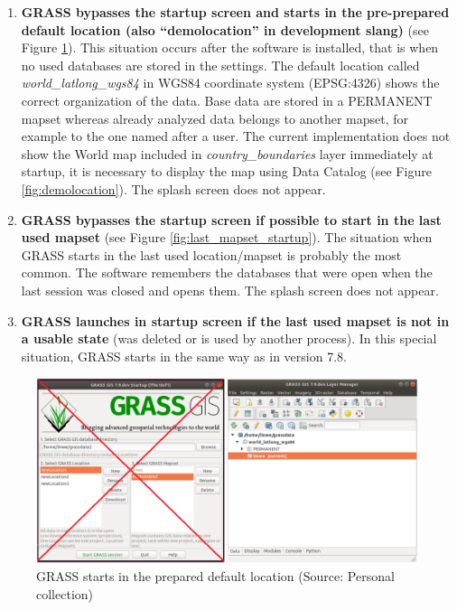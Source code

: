 \documentclass[a4paper,10pt,twoside]{article}
\begin{document}
\begin{enumerate}

\item \textbf{GRASS bypasses the startup screen and starts in the
    pre-prepared default location (also ``demolocation'' in
    development slang)} (see Figure
  \ref{fig:demolocation_startup}). This situation occurs after the
  software is installed, that is when no used databases are stored in
  the settings. The default location called
  \textit{world\_latlong\_wgs84} in WGS84 coordinate system
  (EPSG:4326) shows the correct organization of the data. Base data
  are stored in a PERMANENT mapset whereas already analyzed data
  belongs to another mapset, for example to the one named after a
  user. The current implementation does not show the World map
  included in \textit{country\_boundaries} layer immediately at
  startup, it is necessary to display the map using Data Catalog (see
  Figure \ref{fig:demolocation}). The splash screen does not appear.
\item\textbf{ GRASS bypasses the startup screen if possible to start
    in the last used mapset} (see Figure
  \ref{fig:last_mapset_startup}). The situation when GRASS starts in 
  the last used location/mapset is probably the most common. 
  The software remembers the databases that were open when the
  last session was closed and opens them.  The splash screen does not
  appear.
\item \textbf{GRASS launches in startup screen if the last used mapset
 is not in a usable state} (was deleted or is used by another process). 
 In this special situation, GRASS starts in the same way as in version 7.8.

\end{enumerate}

\vspace{0.3cm}
\begin{figure}[hbt!] 
\begin{center}
\includegraphics[width=17cm]{../pictures/demolocation_startup.png} 
\caption[GRASS starts in the prepared default location]{GRASS starts in the prepared default location (Source: Personal collection)}
\label{fig:demolocation_startup}
\end{center}
\end{figure}
\end{document}
